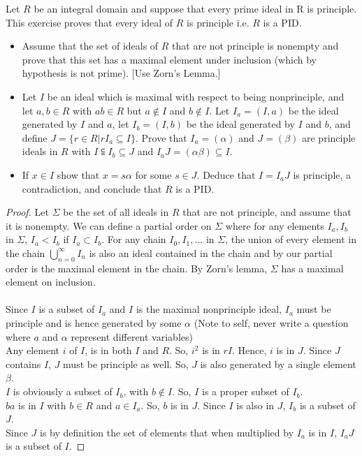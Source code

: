 \documentclass[10pt]{article}
\newenvironment{problem}[2][Problem]{\begin{trivlist}
		\item[\hskip \labelsep {\bfseries #1}\hskip \labelsep {\bfseries #2.}]}{\end{trivlist}}
\begin{document}
	\begin{problem}{2.6}
		Let $R$ be an integral domain and suppose that every prime ideal in R is principle. This exercise proves that every ideal of $R$ is principle i.e. $R$ is a PID.
		\begin{itemize}
			\item[(a)] Assume that the set of ideals of $R$ that are not principle is nonempty and prove that this set has a maximal element under inclusion (which by hypothesis is not prime). [Use Zorn's Lemma.]
			\item[(b)] Let $I$ be an ideal which is maximal with respect to being nonprinciple, and let $a,b \in R$ with $ab \in R$ but $a \notin I$ and $b \notin I$. Let $I_{a} = (I, a)$ be the ideal generated by $I$ and $a$, let $I_{b}=(I, b)$ be the ideal generated by $I$ and $b$, and define $J=\{ r \in R | r I_{a} \subseteq I\}$. Prove that $I_{a}=(\alpha)$ and $J=(\beta)$ are principle ideals in $R$ with $I \subseteqq I_{b} \subseteq J$ and $I_{a}J = (\alpha \beta) \subseteq I$.
			\item[(c)] If $x \in I$ show that $x=s\alpha$ for some $s \in J$. Deduce that $I = I_{a}J$ is principle, a contradiction, and conclude that $R$ is a PID.
		\end{itemize}
		
		\begin{proof}
			Let $\Sigma$ be the set of all ideals in $R$ that are not principle, and assume that it is nonempty. We can define a partial order on $\Sigma$ where for any elements $I_{a}, I_{b}$ in $\Sigma$, $I_{a} < I_{b}$ if $I_{a} \subset I_{b}$. For any chain $I_{0}, I_{1}, ...$ in $\Sigma$, the union of every element in the chain $ \bigcup_{n=0}^{\infty} I_{n}$ is also an ideal contained in the chain and by our partial order is the maximal element in the chain. By Zorn's lemma, $\Sigma$ has a maximal element on inclusion.\\
			\\
			Since $I $ is a subset of $I_{a}$ and $I$ is the maximal nonprinciple ideal, $I_{a}$ must be principle and is hence generated by some $\alpha$ (Note to self, never write a question where $a$ and $\alpha$ represent different variables)\\
			Any element $i$ of $I$, is in both $I$ and $R$. So, $i^{2}$ is in $rI$. Hence, $i$ is in $J$. Since $J$ contains $I$, $J$ must be principle as well. So, $J$ is also generated by a single element $\beta$.\\
			$I$ is obviously a subset of $I_{b}$, with $b \notin I$. So, $I$ is a proper subset of $I_{b}$.\\
			$ba$ is in $I$ with $b \in R$ and $a \in I_{a}$. So, $b$ is in $J$. Since $I$ is also in $J$, $I_{b}$ is a subset of $J$.\\
			Since $J$ is by definition the set of elements that when multiplied by $I_{a}$ is in $I$, $I_{a}J$ is a subset of $I$.
		\end{proof}
		
	\end{problem}
		
		
		
\end{document}
